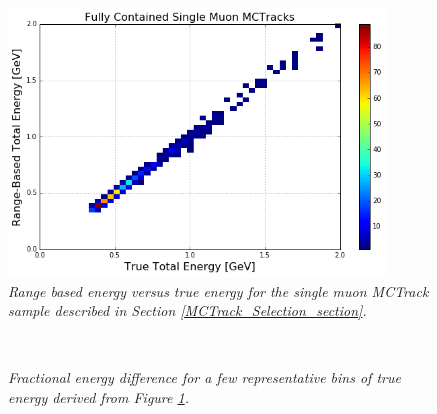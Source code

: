 \begin{figure}[h!]
\begin{center}
\includegraphics[width=100mm]{Figures/true_range_comparison_MCTracks.png}
\end{center}
\caption{\textit{Range based energy versus true energy for the single muon {\sc MCTrack} sample described in Section \ref{MCTrack_Selection_section}.}}
\label{true_range_energy_MCTrack_fig}
\end{figure}

\begin{figure}
\centering
\mbox{
	\quad
	\quad
	}
\caption{\textit{Fractional energy difference for a few representative bins of true energy derived from Figure \ref{true_range_energy_MCTrack_fig}.}}
\label{true_range_bias_resolution_MCTrack_slices_fig}
\end{figure}




